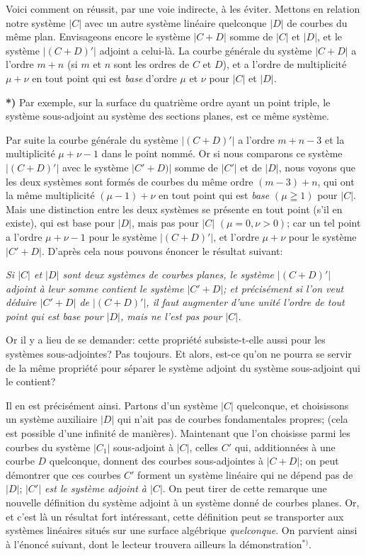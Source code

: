 \documentclass{article}
\begin{document}
Voici comment on réussit, par une voie indirecte, à les éviter. Mettons en relation notre système $|C|$ avec un autre système linéaire quelconque $|D|$ de courbes du même plan. Envisageons encore le système $|C+D|$ somme de $|C|$ et $|D|$, et le système $|(C+D)'|$ adjoint a celui-là. La courbe générale du système $|C+D|$ a l'ordre $m+n$ (si $m$ et $n$ sont les ordres de $C$ et $D$), et a l'ordre de multiplicité $\mu+\nu$ en tout point qui est \emph{base} d'ordre $\mu$ et $\nu$ pour $|C|$ et $|D|$.

\textbf{*)} Par exemple, sur la surface du quatrième ordre ayant un point triple, le système sous-adjoint au système des sections planes, est ce même système.

Par suite la courbe générale du système $|(C+D)'|$ a l'ordre $m+n-3$ et la multiplicité $\mu + \nu - 1$ dans le point nommé. Or si nous comparons ce système $|(C + D)'|$ avec le système $|C' + D)|$ somme de $|C'|$ et de $|D|$, nous voyons que les deux systèmes sont formés de courbes du même ordre $(m - 3) + n$, qui ont la même multiplicité $(\mu - 1) + \nu$ en tout point qui est \emph{base} $(\mu \geqq 1)$ pour $|C|$. Mais une distinction entre les deux systèmes se présente en tout point (s'il en existe), qui est base pour $|D|$, mais pas pour $|C|$ $(\mu = 0, \nu > 0)$; car un tel point a l'ordre $\mu + \nu - 1$ pour le système $|(C + D)'|$, et l'ordre $\mu + \nu$ pour le système $|C' + D|$. D'après cela nous pouvons énoncer le résultat suivant:

\emph{Si $|C|$ et $|D|$ sont deux systèmes de courbes planes, le système $|(C + D)'|$ adjoint à leur somme contient le système $|C' + D|$; et précisément si l'on veut déduire $|C' + D|$ de $|(C + D)'|$, il faut augmenter d'une unité l'ordre de tout point qui est base pour $|D|$, mais ne l'est pas pour $|C|$.}

Or il y a lieu de se demander: cette propriété subsiste-t-elle aussi pour les systèmes sous-adjointes? Pas toujours. Et alors, est-ce qu'on ne pourra se servir de la même propriété pour séparer le système adjoint du système sous-adjoint qui le contient?

Il en est précisément ainsi. Partons d'un système $|C|$ quelconque, et choisissons un système auxiliaire $|D|$ qui n'ait pas de courbes fondamentales propres; (cela est possible d'une infinité de manières). Maintenant que l'on choisisse parmi les courbes du système $|C_{1}|$ sous-adjoint à $|C|$, celles $C'$ qui, additionnées à une courbe $D$ quelconque, donnent des courbes sous-adjointes à $|C + D|$; on peut démontrer que ces courbes $C'$ forment un système linéaire qui ne dépend pas de $|D|$; \emph{$|C'|$ est le système adjoint à $|C|$}. On peut tirer de cette remarque une nouvelle définition du système adjoint à un système donné de courbes planes. Or, et c'est là un résultat fort intéressant, cette définition peut se transporter aux systèmes linéaires situés sur une surface algébrique \emph{quelconque}. On parvient ainsi à l'énoncé suivant, dont le lecteur trouvera ailleurs la démonstration${}^{*)}$.
\end{document}

